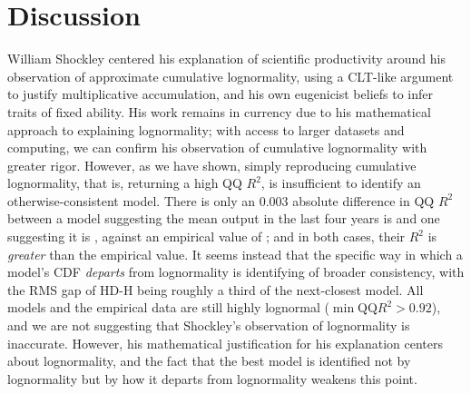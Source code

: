 \documentclass{article}
\begin{document}
\section{Discussion}\label{sec:discussion}

William Shockley centered his explanation of scientific productivity around his observation of approximate cumulative lognormality, using a CLT-like argument to justify multiplicative accumulation, and his own eugenicist beliefs to infer traits of fixed ability. His work remains in currency due to his mathematical approach to explaining lognormality; with access to larger datasets and computing, we can confirm his observation of cumulative lognormality with greater rigor. However, as we have shown, simply reproducing cumulative lognormality, that is, returning a high QQ $R^2$, is insufficient to identify an otherwise-consistent model. There is only an 0.003 absolute difference in QQ $R^2$ between a model suggesting the mean output in the last four years is \GRWFourYearMeanTotal and one suggesting it is \AROneFourYearMeanTotal, against an empirical value of \DBLPFourYearMeanTotal; and in both cases, their $R^2$ is \emph{greater} than the empirical value. It seems instead that the specific way in which a model's CDF \emph{departs} from lognormality is identifying of broader consistency, with the RMS gap of HD-H being roughly a third of the next-closest model. All models and the empirical data are still highly lognormal ($\min \text{QQ} R^2 > 0.92$), and we are not suggesting that Shockley's observation of lognormality is inaccurate. However, his mathematical justification for his explanation centers about lognormality, and the fact that the best model is identified not by lognormality but by how it departs from lognormality weakens this point. 




\end{document}

